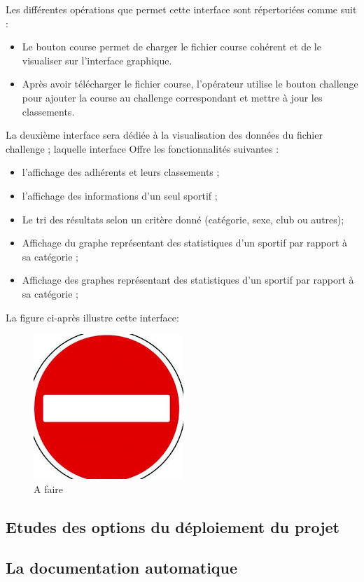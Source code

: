 \documentclass[12pt,a4paper]{report}
\begin{document}
Les différentes opérations que permet cette interface sont répertoriées comme suit : 
\begin{itemize} 
\item  Le bouton course permet de charger le fichier course cohérent et de le visualiser sur l’interface graphique.
\item Après avoir télécharger le fichier course, l’opérateur utilise le bouton challenge pour ajouter la course au challenge correspondant et mettre à jour les classements.
\end{itemize} 

La deuxième interface sera dédiée à la visualisation des données du fichier challenge ; laquelle interface 
Offre les fonctionnalités suivantes : 
\begin{itemize} 
\item l’affichage des adhérents et leurs classements ; 
 \item l’affichage des informations d’un seul sportif ;
 \item Le tri des résultats selon un critère donné (catégorie, sexe, club ou autres);
 \item Affichage du graphe représentant des statistiques d’un sportif par rapport à sa catégorie ;
 \item Affichage des graphes représentant des statistiques d’un sportif par rapport à sa catégorie ;
\end{itemize} 
La figure ci-après illustre cette interface:
\begin{figure}
	  \center
	  \includegraphics[scale=0.5]{A_faire.png}
	   \caption {A faire }
\end{figure}


\subsection {Etudes des options du déploiement du projet }

\subsection {La documentation automatique  }
\end{document}
